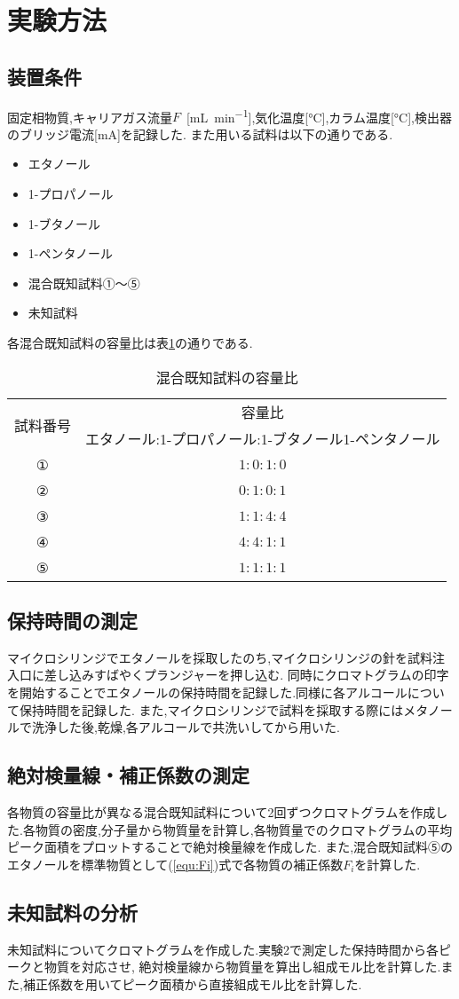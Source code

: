 \section{実験方法}
\subsection{装置条件}
固定相物質,キャリアガス流量$F$\ [\si{\milli L.min^{-1}}],気化温度[\si{\degreeCelsius}],カラム温度[\si{\degreeCelsius}],検出器のブリッジ電流[\si{\milli\ampere}]を記録した.
また用いる試料は以下の通りである.
\begin{itemize}
  \item エタノール
  \item 1-プロパノール
  \item 1-ブタノール
  \item 1-ペンタノール
  \item 混合既知試料①〜⑤
  \item 未知試料
\end{itemize}
各混合既知試料の容量比は表\ref{tab:kongo}の通りである.
\begin{table}[h]
   \caption{混合既知試料の容量比}
   \label{tab:kongo}
   \centering
   \begin{tabular}{cc}
     \hline
     \multirow{2}{*}{試料番号} & 容量比\\
     &エタノール:1-プロパノール:1-ブタノール1-ペンタノール\\
     \hline \hline
     ①&$1:0:1:0$\\
     ②&$0:1:0:1$\\
     ③&$1:1:4:4$\\
     ④&$4:4:1:1$\\
     ⑤&$1:1:1:1$\\
     \hline
   \end{tabular}
\end{table}
\subsection{保持時間の測定}
マイクロシリンジでエタノールを採取したのち,マイクロシリンジの針を試料注入口に差し込みすばやくプランジャーを押し込む.
同時にクロマトグラムの印字を開始することでエタノールの保持時間を記録した.同様に各アルコールについて保持時間を記録した.
また,マイクロシリンジで試料を採取する際にはメタノールで洗浄した後,乾燥,各アルコールで共洗いしてから用いた.
\subsection{絶対検量線・補正係数の測定}
各物質の容量比が異なる混合既知試料について2回ずつクロマトグラムを作成した.各物質の密度,分子量から物質量を計算し,各物質量でのクロマトグラムの平均ピーク面積をプロットすることで絶対検量線を作成した.
また,混合既知試料⑤のエタノールを標準物質として(\ref{equ:Fi})式で各物質の補正係数$F_i$を計算した.
\subsection{未知試料の分析}
未知試料についてクロマトグラムを作成した.実験2で測定した保持時間から各ピークと物質を対応させ,
絶対検量線から物質量を算出し組成モル比を計算した.また,補正係数を用いてピーク面積から直接組成モル比を計算した.


